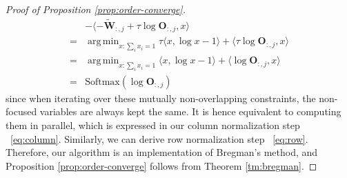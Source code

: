 \documentclass[11pt]{article}
\DeclareMathOperator*{\argmin}{arg\,min}
\begin{document}
\begin{proof}[Proof of Proposition \ref{prop:order-converge}]
\begin{align}
    &- \langle-  \widetilde{ \mathbf{W}}_{:,j} +\tau  \log \mathbf{O}_{:,j} ,x \rangle  \\
    = & \argmin_{x: \sum_i x_i =1 } \tau \langle x, \log x -1 \rangle   + \langle \tau  \log \mathbf{O}_{:,j} ,x \rangle   \\
    = & \argmin_{x: \sum_i x_i =1 } \langle x, \log x -1 \rangle   + \langle  \log \mathbf{O}_{:,j} ,x \rangle   \\
  =& \mathrm{Softmax}(\log \mathbf{O}_{:,j} )
\end{align}
since when iterating over these mutually non-overlapping constraints, the non-focused variables are always kept the same. It is hence equivalent to computing them in parallel, which is expressed in our column normalization step ~\ref{eq:column}. Similarly, we can derive row normalization step ~\ref{eq:row}. Therefore, our algorithm is an implementation of Bregman's method, and Proposition \ref{prop:order-converge} follows from Theorem \ref{tm:bregman}.
\end{proof}
\end{document}
